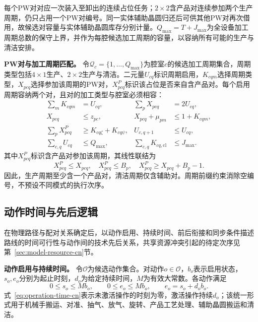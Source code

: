 \documentclass[final,5p,times,twocolumn]{elsarticle}
\begin{document}
每个PW对对应一次装入至卸出的连续占位任务；$2\times2$含产品对连续参加两个生产周期，仍只占用一个PW对编号。同一实体辅助晶圆归还后可供其他PW对再次借用，故候选对容量与实体辅助晶圆库存分别计量。$Q_{\max}=T+J_{\max}$为全设备加工周期总数的保守上界，并作为每腔候选加工周期的容量，以容纳所有可能的生产与清洁安排。

\noindent\textbf{PW对与加工周期匹配。}
令$\mathcal Q_c=\{1,\ldots,Q_{\max}\}$为腔室$c$的候选加工周期集合，周期类型包括$4\times1$生产、$2\times2$生产与清洁。二元量$U_{cq}$标识周期启用，$K_{cqm}$选择周期类型，$X_{pcq}$选择参加该周期的PW对，$X^P_{pcq}$标识该占位是否来自含产品对。每个启用周期容纳两个对，且对的加工类型与腔室必须相容：
\begin{equation}
\begin{aligned}
\sum_mK_{cqm}&=U_{cq}, &\sum_pX_{pcq}&=2U_{cq},\\
X_{pcq}&\le z_{pc}, &X_{pcq}+\mu_{pm}&\le1+K_{cqm},\\
\sum_pX^P_{pcq}&\ge K_{cq\zeta}+K_{cq\psi}, &U_{c,q+1}&\le U_{cq},\\
\sum_{c,q}U_{cq}&\le Q_{\max}, &\sum_{c,q}K_{cq,\mathrm{cl}}&\le J_{\max}.
\end{aligned}
\label{eq:cycle-capacity-cn}
\end{equation}
其中$X^P_{pcq}$标识含产品对参加该周期，其线性联结为
\begin{equation}
X^P_{pcq}\le X_{pcq},\quad X^P_{pcq}\le B_p,\quad
X^P_{pcq}\ge X_{pcq}+B_p-1.
\label{eq:cycle-products-cn}
\end{equation}
因此，生产周期至少含一个产品对，清洁周期仅含辅助对。周期前缀约束消除空编号，不预设不同模式的执行次序。

\subsection{动作时间与先后逻辑}
\label{sec:model-time-cn}

在物理路径与配对关系确定后，以动作启用、持续时间、前后衔接和同步条件描述路线的时间可行性与动作间的技术先后关系，共享资源冲突引起的待定次序见第~\ref{sec:model-resource-cn}节。

\noindent\textbf{动作启用与持续时间。}
令$\mathcal O$为候选动作集合。对动作$o\in\mathcal O$，$b_o$表示启用状态，$s_o,e_o$分别为起止时刻，$d_o$为给定持续时间，$M$为有效大常数。各动作满足
\begin{equation}
0\le s_o\le Mb_o,\qquad
0\le e_o\le Mb_o,\qquad
e_o=s_o+d_ob_o.
\label{eq:operation-time-cn}
\end{equation}
式~\eqref{eq:operation-time-cn}表示未激活操作的时刻为零，激活操作持续$d_o$；该统一形式用于机械手搬运、对准、抽气、放气、旋转、产品工艺处理、辅助晶圆搬运和清洁。
\end{document}
